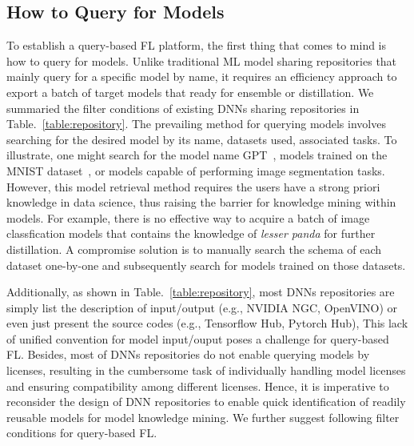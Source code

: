 
\subsection{How to Query for Models}
To establish a query-based FL platform, the first thing that comes to mind is how to query for models.
Unlike traditional ML model sharing repositories that mainly query for a specific model by name, it requires an efficiency approach to export a batch of target models that ready for ensemble or distillation.
We summaried the filter conditions of existing DNNs sharing repositories in Table.~\ref{table:repository}.
The prevailing method for querying models involves searching for the desired model by its name, datasets used, associated tasks.
To illustrate, one might search for the model name GPT~\cite{radford2019language}, models trained on the MNIST dataset~\cite{lecun2010mnist}, or models capable of performing image segmentation tasks.
However, this model retrieval method requires the users have a strong priori knowledge in data science, thus raising the barrier for knowledge mining within models.
For example, there is no effective way to acquire a batch of image classfication models that contains the knowledge of \textit{lesser panda} for further distillation.
A compromise solution is to manually search the schema of each dataset one-by-one and subsequently search for models trained on those datasets.

Additionally, as shown in Table.~\ref{table:repository}, most DNNs repositories are simply list the description of input/output (e.g., NVIDIA NGC, OpenVINO) or even just present the source codes (e.g., Tensorflow Hub, Pytorch Hub),
This lack of unified convention for model input/ouput poses a challenge for query-based FL.
Besides, most of DNNs repositories do not enable querying models by licenses, resulting in the cumbersome task of individually handling model licenses and ensuring compatibility among different licenses.
Hence, it is imperative to reconsider the design of DNN repositories to enable quick identification of readily reusable models for model knowledge mining. We further suggest following filter conditions for query-based FL.

